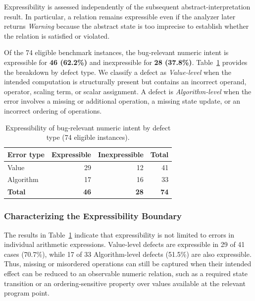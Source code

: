 \documentclass[pdflatex,sn-basic]{sn-jnl}%
\theoremstyle{thmstyleone}%
\theoremstyle{thmstyletwo}%
\theoremstyle{thmstylethree}%
\begin{document}
Expressibility is assessed independently of the subsequent abstract-interpretation
result. In particular, a relation remains expressible even if the analyzer later
returns \textit{Warning} because the abstract state is too imprecise to establish
whether the relation is satisfied or violated.

Of the 74 eligible benchmark instances, the bug-relevant numeric intent is
expressible for \textbf{46 (62.2\%)} and inexpressible for
\textbf{28 (37.8\%)}. Table~\ref{tab:rq1-expressibility} provides the
breakdown by defect type. We classify a defect as \emph{Value-level} when the
intended computation is structurally present but contains an incorrect operand,
operator, scaling term, or scalar assignment. A defect is \emph{Algorithm-level}
when the error involves a missing or additional operation, a missing state update,
or an incorrect ordering of operations.

\begin{table}[t]
\centering
\caption{Expressibility of bug-relevant numeric intent by defect type
(74 eligible instances).}
\label{tab:rq1-expressibility}
\small
\begin{tabular}{lrrr}
\toprule
\textbf{Error type} & \textbf{Expressible} & \textbf{Inexpressible} & \textbf{Total} \\
\midrule
Value     & 29 & 12 & 41 \\
Algorithm & 17 & 16 & 33 \\
\midrule
\textbf{Total} & \textbf{46} & \textbf{28} & \textbf{74} \\
\bottomrule
\end{tabular}
\end{table}


\subsubsection{Characterizing the Expressibility Boundary}\label{sec:rq1:boundary}

The results in Table~\ref{tab:rq1-expressibility} indicate that expressibility is
not limited to errors in individual arithmetic expressions. Value-level defects are
expressible in 29 of 41 cases (70.7\%), while 17 of 33 Algorithm-level defects
(51.5\%) are also expressible. Thus, missing or misordered operations can still be
captured when their intended effect can be reduced to an observable numeric relation,
such as a required state transition or an ordering-sensitive property over values
available at the relevant program point.
\end{document}
